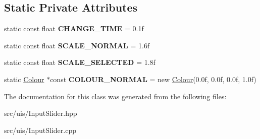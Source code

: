 \subsection*{Static Private Attributes}
\begin{DoxyCompactItemize}
\item 
\mbox{\label{class_flounder_1_1_input_slider_a661542e8a8f06326cb4fe5adaba2f0b3}} 
static const float {\bfseries C\+H\+A\+N\+G\+E\+\_\+\+T\+I\+ME} = 0.\+1f
\item 
\mbox{\label{class_flounder_1_1_input_slider_a0b8486b943aa72a0f736c9ecb064f7e6}} 
static const float {\bfseries S\+C\+A\+L\+E\+\_\+\+N\+O\+R\+M\+AL} = 1.\+6f
\item 
\mbox{\label{class_flounder_1_1_input_slider_a1bda8a0abce5012136b9d192c6b8f96b}} 
static const float {\bfseries S\+C\+A\+L\+E\+\_\+\+S\+E\+L\+E\+C\+T\+ED} = 1.\+8f
\item 
\mbox{\label{class_flounder_1_1_input_slider_a5b737c336bffc9b95f7470bfa795c025}} 
static \hyperlink{class_flounder_1_1_colour}{Colour} $\ast$const {\bfseries C\+O\+L\+O\+U\+R\+\_\+\+N\+O\+R\+M\+AL} = new \hyperlink{class_flounder_1_1_colour}{Colour}(0.\+0f, 0.\+0f, 0.\+0f, 1.\+0f)
\end{DoxyCompactItemize}


The documentation for this class was generated from the following files\+:\begin{DoxyCompactItemize}
\item 
src/uis/Input\+Slider.\+hpp\item 
src/uis/Input\+Slider.\+cpp\end{DoxyCompactItemize}
